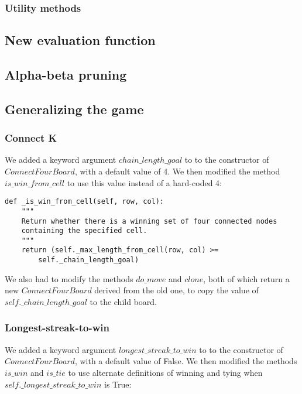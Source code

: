 \documentclass[11pt]{article}
\begin{document}
\subsubsection{Utility methods}

\subsection{New evaluation function}

\subsection{Alpha-beta pruning}

\subsection{Generalizing the game}

\subsubsection{Connect K}

We added a keyword argument \(chain\_length\_goal\) to to the constructor of
\(ConnectFourBoard\), with a default value of 4. We then modified the method
\(is\_win\_from\_cell\) to use this value instead of a hard-coded 4:

\lstset{language=Python}
\begin{lstlisting}[frame=single]
def _is_win_from_cell(self, row, col):
	"""
	Return whether there is a winning set of four connected nodes
	containing the specified cell.
	"""
	return (self._max_length_from_cell(row, col) >=
		self._chain_length_goal)
\end{lstlisting}

We also had to modify the methods \(do\_move\) and \(clone\), both of which
return a new \(ConnectFourBoard\) derived from the old one, to copy the value
of \(self.\_chain\_length\_goal\) to the child board.

\subsubsection{Longest-streak-to-win}

We added a keyword argument \(longest\_streak\_to\_win\) to to the
constructor of \(ConnectFourBoard\), with a default value of False. We then
modified the methods \(is\_win\) and \(is\_tie\) to use alternate definitions
of winning and tying when \(self.\_longest\_streak\_to\_win\) is True:
\end{document}
